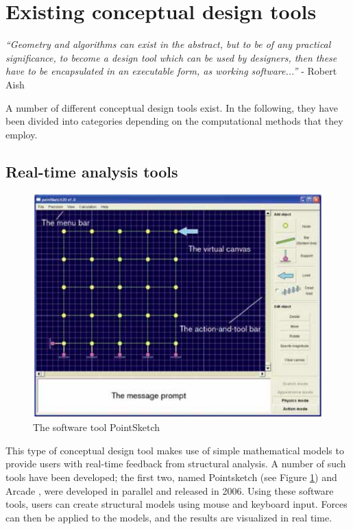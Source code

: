 \section{Existing conceptual design tools}

\textit{``Geometry and algorithms can exist in the abstract, but to be of any practical significance, to become a design tool which can be used by designers, then these have to be encapsulated in an executable form, as working software...''} - Robert Aish \cite{Shea2005}

A number of different conceptual design tools exist. In the following, they have been divided into categories depending on the computational methods that they employ.

\subsection{Real-time analysis tools}

\begin{figure}
  \includegraphics[width=320pt]{graphics/pointsketch.png}
  \caption{The software tool PointSketch}
  \label{fig:pointsketch}
\end{figure}

This type of conceptual design tool makes use of simple mathematical models to provide users with real-time feedback from structural analysis. A number of such tools have been developed; the first two, named Pointsketch \cite{Olsson2006} (see Figure \ref{fig:pointsketch}) and Arcade \cite{martini2008new}, were developed in parallel and released in 2006. Using these software tools, users can create structural models using mouse and keyboard input. Forces can then be applied to the models, and the results are visualized in real time. 

